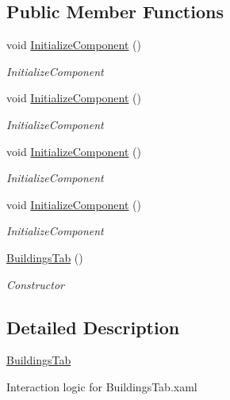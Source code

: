 \subsection*{Public Member Functions}
\begin{DoxyCompactItemize}
\item 
void \hyperlink{class_baudi_1_1_client_1_1_view_1_1_tabs_1_1_buildings_tab_a08942d2de45d73f18f935bae7f32ad1a}{Initialize\+Component} ()
\begin{DoxyCompactList}\small\item\em Initialize\+Component \end{DoxyCompactList}\item 
void \hyperlink{class_baudi_1_1_client_1_1_view_1_1_tabs_1_1_buildings_tab_a08942d2de45d73f18f935bae7f32ad1a}{Initialize\+Component} ()
\begin{DoxyCompactList}\small\item\em Initialize\+Component \end{DoxyCompactList}\item 
void \hyperlink{class_baudi_1_1_client_1_1_view_1_1_tabs_1_1_buildings_tab_a08942d2de45d73f18f935bae7f32ad1a}{Initialize\+Component} ()
\begin{DoxyCompactList}\small\item\em Initialize\+Component \end{DoxyCompactList}\item 
void \hyperlink{class_baudi_1_1_client_1_1_view_1_1_tabs_1_1_buildings_tab_a08942d2de45d73f18f935bae7f32ad1a}{Initialize\+Component} ()
\begin{DoxyCompactList}\small\item\em Initialize\+Component \end{DoxyCompactList}\item 
\hyperlink{class_baudi_1_1_client_1_1_view_1_1_tabs_1_1_buildings_tab_a1ea2e34881527c4cdfd4ed532322e32c}{Buildings\+Tab} ()
\begin{DoxyCompactList}\small\item\em Constructor \end{DoxyCompactList}\end{DoxyCompactItemize}


\subsection{Detailed Description}
\hyperlink{class_baudi_1_1_client_1_1_view_1_1_tabs_1_1_buildings_tab}{Buildings\+Tab} 

Interaction logic for Buildings\+Tab.\+xaml 

